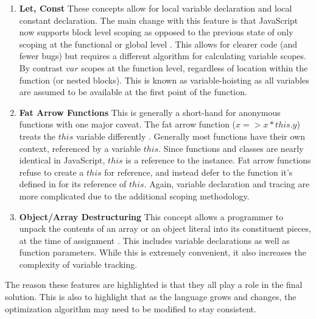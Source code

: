   \begin{enumerate}
    \item \textbf{Let, Const} These concepts allow for local variable declaration and local constant declaration.  The main change with this feature is that JavaScript now supports block level scoping as opposed to the previous state of only scoping at the functional or global level \cite{let16} \cite{const16}.  This allows for clearer code (and fewer bugs) but requires a different algorithm for calculating variable scopes.  By contrast $var$ scopes at the function level, regardless of location within the function (or nested blocks).  This is known as variable-hoisting as all variables are assumed to be available at the first point of the function.
    \item \textbf{Fat Arrow Functions} This is generally a short-hand for anonymous functions with one major caveat.  The fat arrow function ($x => x * this.y$) treats the $this$ variable differently \cite{arrowfn16}.  Generally most functions have their own context, referenced by a variable $this$.  Since functions and classes are nearly identical in JavaScript, $this$ is a reference to the instance.  Fat arrow functions refuse to create a $this$ for reference, and instead defer to the function it's defined in for its reference of $this$. Again, variable declaration and tracing are more complicated due to the additional scoping methodology.
    \item \textbf{Object/Array Destructuring}  This concept allows a programmer to unpack the contents of an array or an object literal into its constituent pieces, at the time of assignment \cite{destructuring16}.  This includes variable declarations as well as function parameters.  While this is extremely convenient, it also increases the complexity of variable tracking.  
  \end{enumerate}

The reason these features are highlighted is that they all play a role in the final solution.  This is also to highlight that as the language grows and changes, the optimization algorithm may need to be modified to stay consistent. 